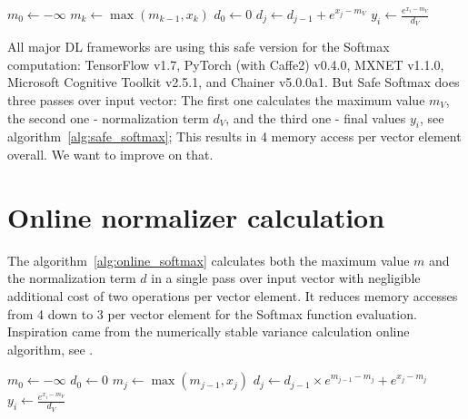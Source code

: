 \begin{algorithm}[ht]
\caption{Safe softmax}
\label{alg:safe_softmax}
\begin{algorithmic}[1]
\State $m_0\gets -\infty$
\State $m_k\gets \max(m_{k-1},{x_k})$
\EndFor
\State $d_0\gets 0$
\State $d_j\gets d_{j-1}+e^{x_j-m_V}$
\EndFor
{}
\State $y_i\gets \frac{e^{x_i-m_V}}{d_V}$
\EndFor
\end{algorithmic}
\end{algorithm}

All major DL frameworks are using this safe version for the Softmax computation: TensorFlow \cite{tensorflow2015-whitepaper} v1.7, PyTorch \cite{paszke2017automatic} (with Caffe2) v0.4.0, MXNET \cite{mxnet_learningsys2015} v1.1.0, Microsoft Cognitive Toolkit \cite{Seide:2016:CMO:2939672.2945397} v2.5.1, and Chainer \cite{chainer_learningsys2015} v5.0.0a1. But Safe Softmax does three passes over input vector: The first one calculates the maximum value $m_V$, the second one - normalization term $d_V$, and the third one - final values $y_i$, see algorithm~\ref{alg:safe_softmax}; This results in 4 memory access per vector element overall. We want to improve on that.

\section{Online normalizer calculation} The algorithm~\ref{alg:online_softmax} calculates both the maximum value $m$ and the normalization term $d$ in a single pass over input vector with negligible additional cost of two operations per vector element. It reduces memory accesses from 4 down to 3 per vector element for the Softmax function evaluation. Inspiration came from the numerically stable variance calculation online algorithm, see \cite{doi:10.1080/00401706.1962.10490022}.

\begin{algorithm}[ht]
\caption{Safe softmax with online normalizer calculation}
\label{alg:online_softmax}
\begin{algorithmic}[1]
\State $m_0\gets -\infty$\label{alg:start_thm_line}
\State $d_0\gets 0$
\State $m_j\gets \max\left(m_{j-1},x_j\right)$\label{alg:m_line}
\State $d_j\gets d_{j-1}\times e^{m_{j-1}-m_j} +e^{x_j-m_j}$\label{alg:d_line}
\EndFor\label{alg:end_thm_line}
\State $y_i\gets \frac{e^{x_i-m_V}}{d_V}$
\EndFor
\end{algorithmic}
\end{algorithm}

